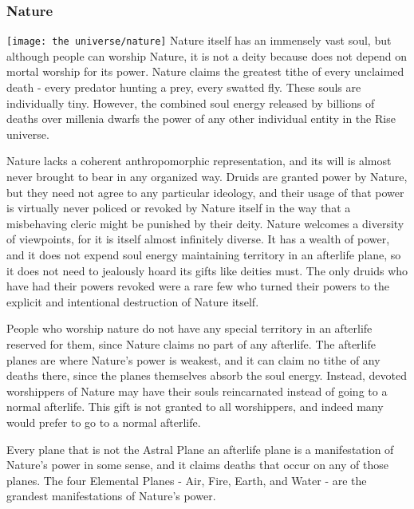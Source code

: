         \subsubsection{Nature}
            \texttt{[image: the universe/nature]}
            Nature itself has an immensely vast soul, but although people can worship Nature, it is not a deity because does not depend on mortal worship for its power.
            Nature claims the greatest tithe of every unclaimed death - every predator hunting a prey, every swatted fly.
            These souls are individually tiny.
            However, the combined soul energy released by billions of deaths over millenia dwarfs the power of any other individual entity in the Rise universe.

            Nature lacks a coherent anthropomorphic representation, and its will is almost never brought to bear in any organized way.
            Druids are granted power by Nature, but they need not agree to any particular ideology, and their usage of that power is virtually never policed or revoked by Nature itself in the way that a misbehaving cleric might be punished by their deity.
            Nature welcomes a diversity of viewpoints, for it is itself almost infinitely diverse.
            It has a wealth of power, and it does not expend soul energy maintaining territory in an afterlife plane, so it does not need to jealously hoard its gifts like deities must.
            The only druids who have had their powers revoked were a rare few who turned their powers to the explicit and intentional destruction of Nature itself.

            People who worship nature do not have any special territory in an afterlife reserved for them, since Nature claims no part of any afterlife.
            The afterlife planes are where Nature's power is weakest, and it can claim no tithe of any deaths there, since the planes themselves absorb the soul energy.
            Instead, devoted worshippers of Nature may have their souls reincarnated instead of going to a normal afterlife.
            This gift is not granted to all worshippers, and indeed many would prefer to go to a normal afterlife.

            Every plane that is not the Astral Plane an afterlife plane is a manifestation of Nature's power in some sense, and it claims deaths that occur on any of those planes.
            The four Elemental Planes - Air, Fire, Earth, and Water - are the grandest manifestations of Nature's power.

